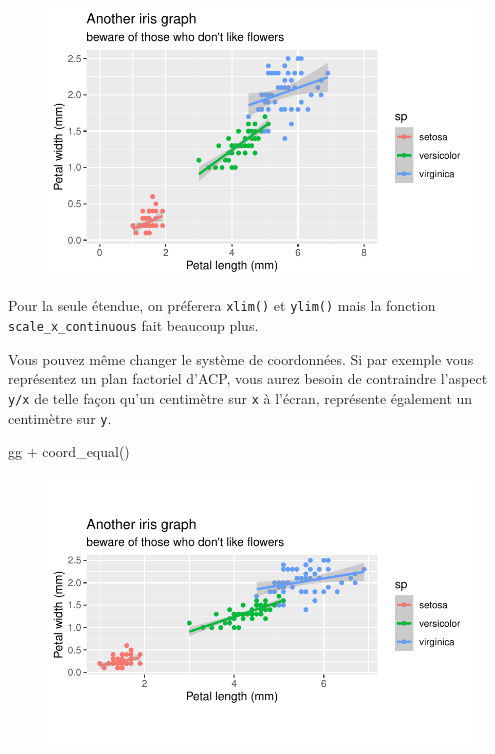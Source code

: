 \documentclass[
  letterpaper,
  DIV=11,
  numbers=noendperiod]{scrreprt}
\newenvironment{Shaded}{\begin{snugshade}}{\end{snugshade}}
\newcommand{\FunctionTok}[1]{\textcolor[rgb]{0.28,0.35,0.67}{#1}}
\newcommand{\NormalTok}[1]{\textcolor[rgb]{0.00,0.23,0.31}{#1}}
\newcommand{\SpecialCharTok}[1]{\textcolor[rgb]{0.37,0.37,0.37}{#1}}
\begin{document}
\begin{figure}[H]

{\centering \includegraphics{ggplot2_files/figure-pdf/unnamed-chunk-19-1.pdf}

}

\end{figure}

Pour la seule étendue, on préferera \texttt{xlim()} et \texttt{ylim()}
mais la fonction \texttt{scale\_x\_continuous} fait beaucoup plus.

Vous pouvez même changer le système de coordonnées. Si par exemple vous
représentez un plan factoriel d'ACP, vous aurez besoin de contraindre
l'aspect \texttt{y/x} de telle façon qu'un centimètre sur \texttt{x} à
l'écran, représente également un centimètre sur \texttt{y}.

\begin{Shaded}
\begin{Highlighting}[]
\NormalTok{gg }\SpecialCharTok{+} \FunctionTok{coord\_equal}\NormalTok{()}
\end{Highlighting}
\end{Shaded}

\begin{figure}[H]

{\centering \includegraphics{ggplot2_files/figure-pdf/unnamed-chunk-20-1.pdf}

}

\end{figure}
\end{document}
